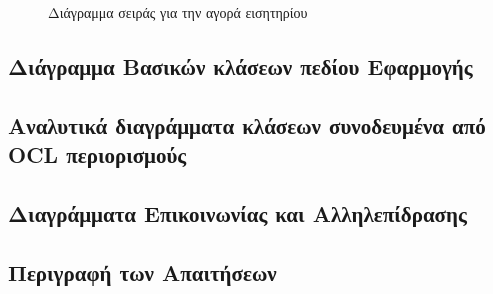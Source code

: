\documentclass{assignment}
\begin{document}
\begin{landscape}
\begin{figure}
\begin{center}
\caption{Διάγραμμα σειράς για την αγορά εισητηρίου}
\label{fig:sequence_ticket}
\end{center}
\end{figure}
\end{landscape}

\subsection{Διάγραμμα Βασικών κλάσεων πεδίου Εφαρμογής}

\subsection{Αναλυτικά διαγράμματα κλάσεων συνοδευμένα από OCL περιορισμούς}

\subsection{Διαγράμματα Επικοινωνίας και Αλληλεπίδρασης}

\subsection{Περιγραφή των Απαιτήσεων}



\end{document}
